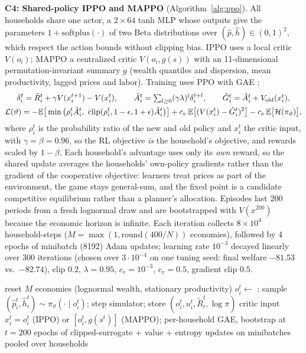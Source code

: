 \documentclass{article}
\newcommand{\E}{\mathbb{E}}
\begin{document}
\textbf{C4: Shared-policy IPPO and MAPPO} (Algorithm~\ref{alg:ppo}). All households share one actor, a $2\times64$ tanh MLP whose outputs give the parameters $1+\mathrm{softplus}(\cdot)$ of two Beta distributions over $(\hat p,\hat h)\in(0,1)^2$, which respect the action bounds without clipping bias. IPPO \cite{dewitt2020} uses a local critic $V(o_i)$; MAPPO \cite{yu2022} a centralized critic $V(o_i,g(s))$ with an 11-dimensional permutation-invariant summary $g$ (wealth quantiles and dispersion, mean productivity, lagged prices and labor). Training uses PPO \cite{schulman2017} with GAE \cite{schulman2016gae}:
\begin{gather*}
\delta_i^t=\tilde R_i^t+\gamma V(x_i^{t+1})-V(x_i^t),\qquad \hat A_i^t=\textstyle\sum_{l\ge0}(\gamma\lambda)^l\delta_i^{t+l},\qquad \hat G_i^t=\hat A_i^t+V_{\rm old}(x_i^t),\\
\mathcal L(\vartheta)=-\E\big[\min\big(\rho_i^t\hat A_i^t,\ \mathrm{clip}(\rho_i^t,1-\epsilon,1+\epsilon)\hat A_i^t\big)\big]+c_v\,\E\big[(V(x_i^t)-\hat G_i^t)^2\big]-c_e\,\E\big[\mathcal H(\pi_\vartheta)\big],
\end{gather*}
where $\rho_i^t$ is the probability ratio of the new and old policy and $x_i^t$ the critic input, with $\gamma=\beta=0.96$, so the RL objective \emph{is} the household's objective, and rewards scaled by $1-\beta$. Each household's advantage uses only its \emph{own} reward, so the shared update averages the households' own-policy gradients rather than the gradient of the cooperative objective: learners treat prices as part of the environment, the game stays general-sum, and the fixed point is a candidate competitive equilibrium rather than a planner's allocation. Episodes last 200 periods from a fresh lognormal draw and are bootstrapped with $V(x^{200})$ because the economic horizon is infinite. Each iteration collects $8\times10^4$ household-steps ($M=\max(1,\mathrm{round}(400/N))$ economies), followed by 4 epochs of minibatch (8192) Adam updates; learning rate $10^{-3}$ decayed linearly over 300 iterations (chosen over $3\cdot10^{-4}$ on one tuning seed: final welfare $-81.53$ vs.\ $-82.74$), clip $0.2$, $\lambda=0.95$, $c_e=10^{-3}$, $c_v=0.5$, gradient clip $0.5$.

\begin{algorithm}[t]
\caption{Shared-policy IPPO / MAPPO for $N$ households}\label{alg:ppo}
\small
\begin{algorithmic}[1]
  \State reset $M$ economies (lognormal wealth, stationary productivity)
   
    \State $o_i^t\gets$ ; sample $(\hat p_i^t,\hat h_i^t)\sim\pi_\vartheta(\cdot\mid o_i^t)$; step simulator; store $(o_i^t,u_i^t,\tilde R_i^t,\log\pi)$
  \EndFor
  \State critic input $x_i^t=o_i^t$ (IPPO) or $[o_i^t,g(s^t)]$ (MAPPO); per-household GAE, bootstrap at $t=200$
   epochs of clipped-surrogate + value + entropy updates on minibatches pooled over households
\EndFor
\end{algorithmic}
\end{algorithm}
\end{document}
